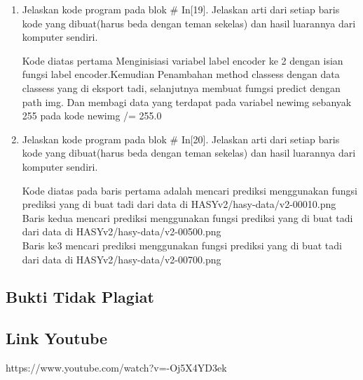 \begin{enumerate}
\item Jelaskan kode program pada blok \# In[19]. Jelaskan arti dari setiap baris
kode yang dibuat(harus beda dengan teman sekelas) dan hasil luarannya dari
komputer sendiri.

	\hfill\break
	

Kode diatas pertama Menginisiasi variabel label encoder ke 2 dengan isian fungsi label encoder.Kemudian Penambahan method classess dengan data classess yang di eksport tadi, selanjutnya  membuat fumgsi predict dengan path img. Dan membagi data yang terdapat pada variabel newimg sebanyak 255 pada kode newimg /= 255.0

\item Jelaskan kode program pada blok \# In[20]. Jelaskan arti dari setiap baris
kode yang dibuat(harus beda dengan teman sekelas) dan hasil luarannya dari
komputer sendiri.

	\hfill\break
	

Kode diatas pada baris pertama adalah mencari prediksi menggunakan fungsi prediksi yang di buat tadi dari data di HASYv2/hasy-data/v2-00010.png\\
Baris kedua mencari prediksi menggunakan fungsi prediksi yang di buat tadi dari data di HASYv2/hasy-data/v2-00500.png\\
Baris ke3 mencari prediksi menggunakan fungsi prediksi yang di buat tadi dari data di HASYv2/hasy-data/v2-00700.png
\end{enumerate}

\subsection{Bukti Tidak Plagiat}


\subsection{Link Youtube}
https://www.youtube.com/watch?v=-Oj5X4YD3ek
